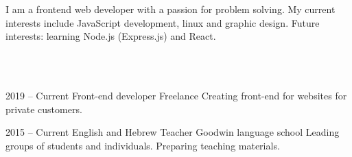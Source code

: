 \documentclass[9pt]{developercv} %
\begin{document}
\vspace{0.5cm}

\begin{minipage}[t]{0.4\textwidth} %
	\vspace{-\baselineskip} %
	
	I am a frontend web developer with a passion for problem solving. 
  My current interests include JavaScript development, linux and graphic design. 
  Future interests: learning Node.js (Express.js) and React.
\end{minipage}
\hfill %
\begin{minipage}[t]{0.5\textwidth} %
	\vspace{-\baselineskip} %
	\begin{barchart}{5.5}
	\end{barchart}
\end{minipage}
\\~\\


\begin{entrylist}
  \entry
      {2019 -- Current}
      {Front-end developer}
      {Freelance}
      {Creating front-end for websites for private customers.}
\end{entrylist}

\begin{entrylist}
  \entry
      {2015 -- Current}
      {English and Hebrew Teacher}
      {Goodwin language school}
      {Leading groups of students and individuals. Preparing teaching materials.}
\end{entrylist}
\\~\\

\end{document}
